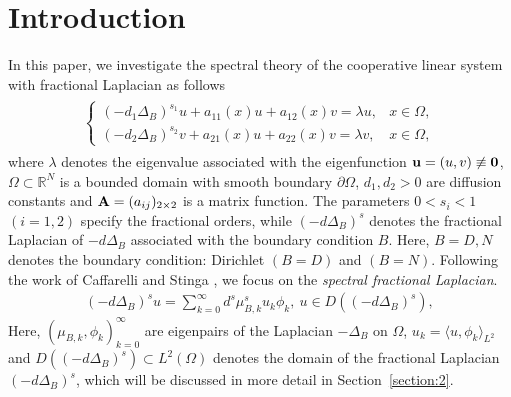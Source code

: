 \documentclass[a4paper,11pt]{amsart}
\theoremstyle{definition}
\def\O{\Omega}
\numberwithin{equation}{section}
\theoremstyle{definition}
\def\O{\Omega}
\begin{document}
\tableofcontents

\section{\bf Introduction}


 In this paper, we investigate the spectral theory of the cooperative linear system with fractional Laplacian as follows
\begin{align}\label{eq:eigen}
\begin{split}
\left\{\begin{array}{lllll}
(-d_1\Delta_B)^{s_1}u+a_{11}(x)u+a_{12}(x)v=\lambda u,&x\in \O, \\
(-d_2\Delta_B)^{s_2}v+a_{21}(x)u+a_{22}(x)v=\lambda v,&x\in \O,
\end{array}\right.
\end{split}
\end{align}
where $\lambda$ denotes the eigenvalue associated with the eigenfunction ${\bf u}=(u,v)\not\equiv {\bf 0}$,  $\Omega \subset \mathbb{R}^N$ is a bounded domain with smooth boundary $\partial \Omega$, $d_1,d_2>0$ are diffusion constants and ${\bf A}=(a_{ij})_{2\times 2}$ is a matrix function. The parameters $0<s_i<1$ $(i=1,2)$ specify the fractional orders, while $(-d\Delta_B)^s$ denotes the fractional Laplacian of $-d\Delta_B$ associated with the boundary condition $B$. Here, $B=D,N$ denotes the boundary condition: Dirichlet $(B=D)$ and $(B=N)$. Following the work of Caffarelli and Stinga \cite{caffarelli_fractional_2016}, we focus on the {\it spectral fractional Laplacian}.
\begin{align*}
(-d\Delta_B)^{s}u=\sum_{k=0}^\infty d^s\mu_{B,k}^su_k\phi_k,~u\in D((-d\Delta_B)^{s}),
\end{align*}
Here, $(\mu_{B,k},\phi_k)_{k=0}^\infty$ are eigenpairs of the Laplacian $-\Delta_B$ on $\O$, 
$u_k=\langle u,\phi_k\rangle_{L^2}$ and $D((-d\Delta_B)^{s})\subset L^2(\Omega)$ 
denotes the domain of the fractional Laplacian $(-d\Delta_B)^{s}$, 
which will be discussed in more detail in Section~\ref{section:2}. 
\end{document}
